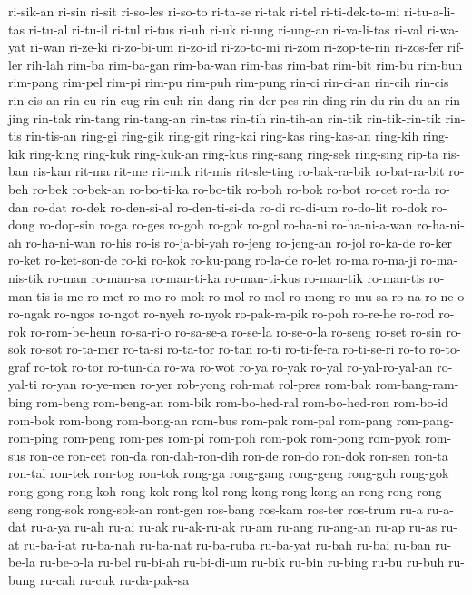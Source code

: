 {ri-sik-an ri-sin ri-sit ri-so-les ri-so-to ri-ta-se ri-tak ri-tel
ri-ti-dek-to-mi ri-tu-a-li-tas ri-tu-al ri-tu-il ri-tul ri-tus ri-uh ri-uk
ri-ung ri-ung-an ri-va-li-tas ri-val ri-wa-yat ri-wan ri-ze-ki ri-zo-bi-um
ri-zo-id ri-zo-to-mi ri-zom ri-zop-te-rin ri-zos-fer rif-ler rih-lah
rim-ba rim-ba-gan rim-ba-wan rim-bas rim-bat rim-bit rim-bu rim-bun
rim-pang rim-pel rim-pi rim-pu rim-puh rim-pung rin-ci rin-ci-an rin-cih
rin-cis rin-cis-an rin-cu rin-cug rin-cuh rin-dang rin-der-pes rin-ding
rin-du rin-du-an rin-jing rin-tak rin-tang rin-tang-an rin-tas rin-tih
rin-tih-an rin-tik rin-tik-rin-tik rin-tis rin-tis-an ring-gi ring-gik
ring-git ring-kai ring-kas ring-kas-an ring-kih ring-kik ring-king
ring-kuk ring-kuk-an ring-kus ring-sang ring-sek ring-sing rip-ta ris-ban
ris-kan rit-ma rit-me rit-mik rit-mis rit-sle-ting ro-bak-ra-bik
ro-bat-ra-bit ro-beh ro-bek ro-bek-an ro-bo-ti-ka ro-bo-tik ro-boh ro-bok
ro-bot ro-cet ro-da ro-dan ro-dat ro-dek ro-den-si-al ro-den-ti-si-da
ro-di ro-di-um ro-do-lit ro-dok ro-dong ro-dop-sin ro-ga ro-ges ro-goh
ro-gok ro-gol ro-ha-ni ro-ha-ni-a-wan ro-ha-ni-ah ro-ha-ni-wan ro-his
ro-is ro-ja-bi-yah ro-jeng ro-jeng-an ro-jol ro-ka-de ro-ker ro-ket
ro-ket-son-de ro-ki ro-kok ro-ku-pang ro-la-de ro-let ro-ma ro-ma-ji
ro-ma-nis-tik ro-man ro-man-sa ro-man-ti-ka ro-man-ti-kus ro-man-tik
ro-man-tis ro-man-tis-is-me ro-met ro-mo ro-mok ro-mol-ro-mol ro-mong
ro-mu-sa ro-na ro-ne-o ro-ngak ro-ngos ro-ngot ro-nyeh ro-nyok
ro-pak-ra-pik ro-poh ro-re-he ro-rod ro-rok ro-rom-be-heun ro-sa-ri-o
ro-sa-se-a ro-se-la ro-se-o-la ro-seng ro-set ro-sin ro-sok ro-sot
ro-ta-mer ro-ta-si ro-ta-tor ro-tan ro-ti ro-ti-fe-ra ro-ti-se-ri ro-to
ro-to-graf ro-tok ro-tor ro-tun-da ro-wa ro-wot ro-ya ro-yak ro-yal
ro-yal-ro-yal-an ro-yal-ti ro-yan ro-ye-men ro-yer rob-yong roh-mat
rol-pres rom-bak rom-bang-ram-bing rom-beng rom-beng-an rom-bik
rom-bo-hed-ral rom-bo-hed-ron rom-bo-id rom-bok rom-bong rom-bong-an
rom-bus rom-pak rom-pal rom-pang rom-pang-rom-ping rom-peng rom-pes rom-pi
rom-poh rom-pok rom-pong rom-pyok rom-sus ron-ce ron-cet ron-da
ron-dah-ron-dih ron-de ron-do ron-dok ron-sen ron-ta ron-tal ron-tek
ron-tog ron-tok rong-ga rong-gang rong-geng rong-goh rong-gok rong-gong
rong-koh rong-kok rong-kol rong-kong rong-kong-an rong-rong rong-seng
rong-sok rong-sok-an ront-gen ros-bang ros-kam ros-ter ros-trum ru-a
ru-a-dat ru-a-ya ru-ah ru-ai ru-ak ru-ak-ru-ak ru-am ru-ang ru-ang-an
ru-ap ru-as ru-at ru-ba-i-at ru-ba-nah ru-ba-nat ru-ba-ruba ru-ba-yat
ru-bah ru-bai ru-ban ru-be-la ru-be-o-la ru-bel ru-bi-ah ru-bi-di-um
ru-bik ru-bin ru-bing ru-bu ru-buh ru-bung ru-cah ru-cuk ru-da-pak-sa
}
